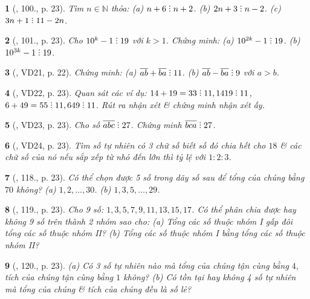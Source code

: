 \documentclass{article}
\newtheorem{baitoan}{}
\DeclareRobustCommand{\divby}{%
	\mathrel{\vbox{\baselineskip.65ex\lineskiplimit0pt\hbox{.}\hbox{.}\hbox{.}}}%
}
\begin{document}
\begin{baitoan}[\cite{Tuyen_Toan_6}, 100., p. 23]
	Tìm $n\in\mathbb{N}$ thỏa: (a) $n + 6\divby n + 2$. (b) $2n + 3\divby n - 2$. (c) $3n + 1\divby11 - 2n$.
\end{baitoan}

\begin{baitoan}[\cite{Tuyen_Toan_6}, 101., p. 23]
	Cho $10^k - 1\divby19$ với $k > 1$. Chứng minh: (a) $10^{2k} - 1\divby19$. (b) $10^{3k} - 1\divby19$.
\end{baitoan}

\begin{baitoan}[\cite{Binh_Toan_6_tap_1}, VD21, p. 22]
	Chứng minh: (a) $\overline{ab} + \overline{ba}\divby11$. (b) $\overline{ab} - \overline{ba}\divby9$ với $a > b$.
\end{baitoan}

\begin{baitoan}[\cite{Binh_Toan_6_tap_1}, VD22, p. 23]
	Quan sát các ví dụ: $14 + 19 = 33\divby11,1419\divby11$, $6 + 49 = 55\divby11,649\divby11$. Rút ra nhận xét \& chứng minh nhận xét ấy.
\end{baitoan}

\begin{baitoan}[\cite{Binh_Toan_6_tap_1}, VD23, p. 23]
	Cho số $\overline{abc}\divby27$. Chứng minh $\overline{bca}\divby27$.
\end{baitoan}

\begin{baitoan}[\cite{Binh_Toan_6_tap_1}, VD24, p. 23]
	Tìm số tự nhiên có 3 chữ số biết số đó chia hết cho $18$ \& các chữ số của nó nếu sắp xếp từ nhỏ đến lớn thì tỷ lệ với $1:2:3$.
\end{baitoan}

\begin{baitoan}[\cite{Binh_Toan_6_tap_1}, 118., p. 23]
	Có thể chọn được 5 số trong dãy số sau để tổng của chúng bằng $70$ không? (a) $1,2,\ldots,30$. (b) $1,3,5,\ldots,29$.
\end{baitoan}

\begin{baitoan}[\cite{Binh_Toan_6_tap_1}, 119., p. 23]
	Cho 9 số: $1,3,5,7,9,11,13,15,17$. Có thể phân chia được hay không 9 số trên thành 2 nhóm sao cho: (a) Tổng các số thuộc nhóm I gấp đôi tổng các số thuộc nhóm II? (b) Tổng các số thuộc nhóm I bằng tổng các số thuộc nhóm II?
\end{baitoan}

\begin{baitoan}[\cite{Binh_Toan_6_tap_1}, 120., p. 23]
	(a) Có 3 số tự nhiên nào mà tổng của chúng tận cùng bằng $4$, tích của chúng tận cùng bằng $1$ không? (b) Có tồn tại hay không 4 số tự nhiên mà tổng của chúng \& tích của chúng đều là số lẻ?
\end{baitoan}
\end{document}

